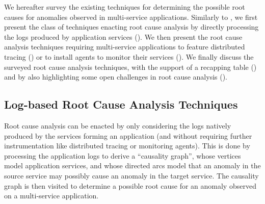 We hereafter survey the existing techniques for determining the possible root causes for anomalies observed in multi-service applications.
Similarly to , we first present the class of techniques enacting root cause analysis by directly processing the logs produced by application services ().
We then present the root cause analysis techniques requiring multi-service applications to feature distributed tracing () or to install agents to monitor their services ().
We finally discuss the surveyed root cause analysis techniques, with the support of a recapping table () and by also highlighting some open challenges in root cause analysis ().

\subsection{Log-based Root Cause Analysis Techniques}
\label{sec:rca:service-logs}
Root cause analysis can be enacted by only considering the logs natively produced by the services forming an application (and without requiring further instrumentation like distributed tracing or monitoring agents).
This is done by processing the application logs to derive a \enquote{causality graph}, whose vertices model application services, and whose directed arcs model that an anomaly in the source service may possibly cause an anomaly in the target service.
The causality graph is then visited to determine a possible root cause for an anomaly observed on a multi-service application.


